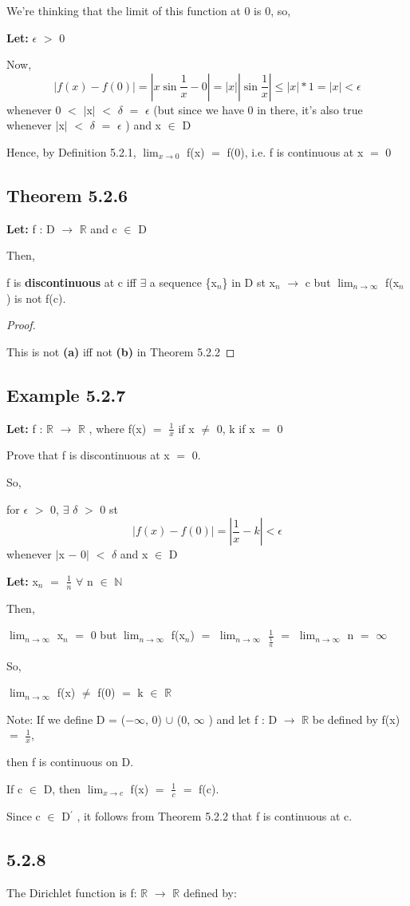 \documentclass{article}
\newcommand{\mt}[1]{\ensuremath{#1}}
\newcommand\ssc[2][\DefaultOpt]{%
  \def\DefaultOpt{#2}%
  \subsection[#1]{#2}%
}
\newcommand{\bgpf}{\begin{proof} $ $\newline}
\newcommand{\lt}[1]{\textbf{Let: } #1}
\newcommand{\bpth}[1]{\textbf{(#1)}}
\newcommand{\epf}{\end{proof}}
\newcommand{\br}{\mt{\mathbb{R}} }       %
\newcommand{\bn}{\mt{\mathbb{N}} }       %
\newcommand{\ep}{\mt{\epsilon} }         %
\newcommand{\fa}{\mt{\forall} }          %
\newcommand{\dta}{\mt{\delta} }
\newcommand{\mem}{\mt{\in} }
\newcommand{\exs}{\mt{\exists} }
\newcommand{\lra}{ \mt{\longrightarrow} } %
\newcommand{\av}[1]{\mt{|}#1\mt{|}}  %
\newcommand{\bk}[1]{\{#1\}}
\newcommand{\ms}{\mt{-} }
\newcommand{\ls}{\mt{<} }
\newcommand{\gr}{\mt{>} }
\newcommand{\lse}{\mt{\leq} }
\newcommand{\eql}{\mt{=} }
\newcommand{\pr}{\mt{^\prime} } 		   %
\newcommand{\uw}[2]{#1\mt{_{#2}}}
\newcommand{\frc}[2]{\mt{\frac{#1}{#2}}}
\newcommand{\lmti}[1]{\mt{\displaystyle{\lim_{#1 \to \infty}}}}
\newcommand{\limt}[2]{\mt{\displaystyle{\lim_{#1 \to #2}}}}
\newcommand{\eqn}[1]{\[#1\]}
\newcommand{\infy}{\mt{\infty} }
\newcommand{\unn}{\mt{\cup} }
\begin{document}
{{We're thinking that the limit of this function at 0 is 0, so,

\lt{\ep \gr 0}

Now,
\eqn{|f(x) - f(0)| = |x\sin\frac{1}{x} - 0| = |x||\sin\frac{1}{x}| \lse |x| * 1 = |x| \ls \ep}
whenever 0 \ls \av{x} \ls \dta \eql \ep (but since we have 0 in there, it's also true whenever \av{x} \ls \dta \eql \ep) and x \mem D

Hence, by Definition 5.2.1, \limt{x}{0} f(x) \eql f(0), i.e. f is continuous at x \eql 0

}

\ssc{Theorem 5.2.6}{
\lt{f : D \lra \br and c \mem D}

Then,

f is \textbf{discontinuous} at c iff \exs a sequence \bk{\uw{x}{n}} in D st \uw{x}{n} \lra c but \lmti{n} f(\uw{x}{n}) is not f(c).

\bgpf

This is not \bpth{a} iff not \bpth{b} in Theorem 5.2.2

\epf
}

\ssc{Example 5.2.7}{

\lt{f : \br \lra \br, where f(x) \eql \frc{1}{x} if x $\neq$ 0, k if x \eql 0}

Prove that f is discontinuous at x \eql 0.

So,

for \ep \gr 0, \exs \dta \gr 0 st
\eqn{|f(x) - f(0)| = |\frac{1}{x} - k| < \ep}
whenever \av{x \ms 0} \ls \dta and x \mem D

\lt{\uw{x}{n} \eql \frc{1}{n} \fa n \mem \bn}

Then,

\lmti{n} \uw{x}{n} \eql 0 but \lmti{n} f(\uw{x}{n}) \eql \lmti{n} \frc{1}{\frc{1}{n}} \eql \lmti{n} n \eql \infy

So,

\lmti{n} f(x) $\neq$ f(0) \eql k \mem \br

Note: If we define D = ($-\infty$, 0) \unn (0, \infy) and let f : D \lra \br be defined by f(x) \eql \frc{1}{x}, 

then f is continuous on D.

If c \mem D, then \limt{x}{c} f(x) \eql \frc{1}{c} \eql f(c).

Since c \mem D\pr, it follows from Theorem 5.2.2 that f is continuous at c.

}

\ssc{5.2.8}{

The Dirichlet function is f: \br \lra \br defined by:

}}
\end{document}
